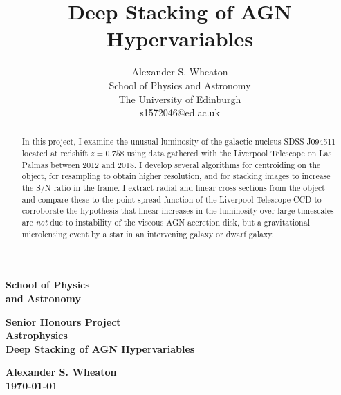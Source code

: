 \documentclass[a4paper,11pt]{article}
\title{Deep Stacking of AGN Hypervariables}
\author{
    Alexander S. Wheaton\\
    School of Physics and Astronomy\\
    The University of Edinburgh\\
    s1572046@ed.ac.uk\break
}
\begin{document}
\pagestyle{empty}                       %
\epsfxsize=40mm                         %
\begin{minipage}[b]{110mm}
    {\Huge\bf School of Physics\\ and Astronomy
    \vspace*{17mm}}
\end{minipage}
\hfill
\begin{minipage}[t]{40mm}
\end{minipage}
\par\noindent                                           %
\vspace*{2cm}
\begin{center}
    \Large\bf \Large\bf Senior Honours Project\\
    \Large\bf Astrophysics\\[10pt]                     %
    \LARGE\bf Deep Stacking of AGN Hypervariables
\end{center}
\vspace*{0.5cm}
\begin{center}
    \bf Alexander S. Wheaton\\
    \today
\end{center}
\vspace*{5mm}

\begin{abstract}
    In this project, I examine the unusual luminosity of the galactic nucleus
    SDSS J094511 located at redshift $z=0.758$ using data gathered with the
    Liverpool Telescope on Las Palmas between 2012 and 2018. I develop several
    algorithms for centroiding on the object, for resampling to obtain higher
    resolution, and for stacking images to increase the S/N ratio in the frame.
    I extract radial and linear cross sections from the object and compare these
    to the point-spread-function of the Liverpool Telescope CCD to corroborate
    the hypothesis that linear increases in the luminosity over large timescales
    are \textit{not} due to instability of the viscous AGN accretion disk, but a
    gravitational microlensing event by a star in an intervening galaxy or dwarf
    galaxy.
\end{abstract}
\end{document}
